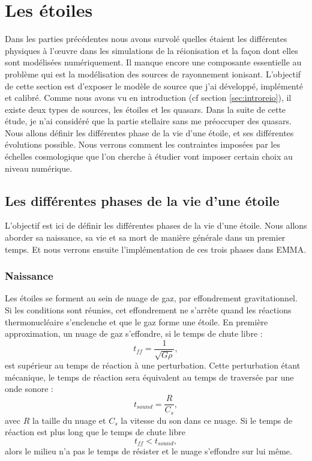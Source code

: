 \chapter{Les étoiles}
\label{sec:etoiles}

Dans les parties précédentes nous avons survolé quelles étaient les différentes physiques à l’œuvre dans les simulations de la réionisation et la façon dont elles sont modélisées numériquement.
Il manque encore une composante essentielle au problème qui est la modélisation des sources de rayonnement ionisant.
L'objectif de cette section est d'exposer le modèle de source que j'ai développé, implémenté et calibré.
Comme nous avons vu en introduction (cf section \ref{sec:introreio}), il existe deux types de sources, les étoiles et les quasars.
Dans la suite de cette étude, je n'ai considéré que la partie stellaire sans me préoccuper des quasars.
Nous allons définir les différentes phase de la vie d'une étoile, et ses différentes évolutions possible.
Nous verrons comment les contraintes imposées par les échelles cosmologique que l'on cherche à étudier vont imposer certain choix au niveau numérique.

\section{Les différentes phases de la vie d'une étoile}

L'objectif est ici de définir les différentes phases de la vie d'une étoile.
Nous allons aborder sa naissance, sa vie et sa mort de manière générale dans un premier temps.
Et nous verrons ensuite l'implémentation de ces trois phases dans EMMA.

\subsection{Naissance}


Les étoiles se forment au sein de nuage de gaz,  par effondrement gravitationnel.
Si les conditions sont réunies, cet effondrement ne s'arrête quand les réactions thermonucléaire s'enclenche et que le gaz forme une étoile.
En première approximation, un nuage de gaz s'effondre, si le temps de chute libre : 
\begin{equation}
t_{ff} = \frac{1}{\sqrt{G \rho}},
\end{equation}
est supérieur au temps de réaction à une perturbation.
Cette perturbation étant mécanique, le temps de réaction sera équivalent au temps de traversée par une onde sonore :
 \begin{equation}
t_{sound} = \frac{R}{C_s},
\end{equation}
avec $R$ la taille du nuage et $C_s$ la vitesse du son dans ce nuage.
Si le temps de réaction est plus long que le temps de chute libre
\begin{equation}
t_{ff} < t_{sound},
\end{equation}
alors le milieu n'a pas le temps de résister et le nuage s'effondre sur lui même.

